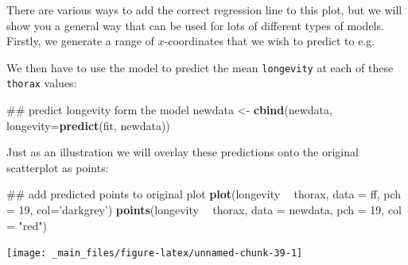 \documentclass[]{book}
\newenvironment{Shaded}{\begin{snugshade}}{\end{snugshade}}
\newcommand{\KeywordTok}[1]{\textcolor[rgb]{0.13,0.29,0.53}{\textbf{#1}}}
\newcommand{\DataTypeTok}[1]{\textcolor[rgb]{0.13,0.29,0.53}{#1}}
\newcommand{\DecValTok}[1]{\textcolor[rgb]{0.00,0.00,0.81}{#1}}
\newcommand{\StringTok}[1]{\textcolor[rgb]{0.31,0.60,0.02}{#1}}
\newcommand{\OperatorTok}[1]{\textcolor[rgb]{0.81,0.36,0.00}{\textbf{#1}}}
\newcommand{\NormalTok}[1]{#1}
\theoremstyle{definition}
\theoremstyle{definition}
\theoremstyle{definition}
\theoremstyle{remark}
\begin{document}
There are various ways to add the correct regression line to this plot,
but we will show you a general way that can be used for lots of
different types of models. Firstly, we generate a range of
\(x\)-coordinates that we wish to predict to e.g.

\begin{Shaded}
\end{Shaded}

We then have to use the model to predict the mean \texttt{longevity} at
each of these \texttt{thorax} values:

\begin{Shaded}
\begin{Highlighting}[]
\NormalTok{## predict longevity form the model}
\NormalTok{newdata <-}\StringTok{ }\KeywordTok{cbind}\NormalTok{(newdata, }\DataTypeTok{longevity=}\KeywordTok{predict}\NormalTok{(fit, newdata))}
\end{Highlighting}
\end{Shaded}

Just as an illustration we will overlay these predictions onto the
original scatterplot as points:

\begin{Shaded}
\begin{Highlighting}[]
\NormalTok{## add predicted points to original plot}
\KeywordTok{plot}\NormalTok{(longevity }\OperatorTok{~}\StringTok{ }\NormalTok{thorax, }\DataTypeTok{data =}\NormalTok{ ff, }\DataTypeTok{pch =} \DecValTok{19}\NormalTok{, }\DataTypeTok{col=}\StringTok{'darkgrey'}\NormalTok{)}
\KeywordTok{points}\NormalTok{(longevity }\OperatorTok{~}\StringTok{ }\NormalTok{thorax, }\DataTypeTok{data =}\NormalTok{ newdata, }\DataTypeTok{pch =} \DecValTok{19}\NormalTok{, }\DataTypeTok{col =} \StringTok{"red"}\NormalTok{)}
\end{Highlighting}
\end{Shaded}

\begin{center}\texttt{[image: \_main\_files/figure-latex/unnamed-chunk-39-1]} \end{center}
\end{document}
